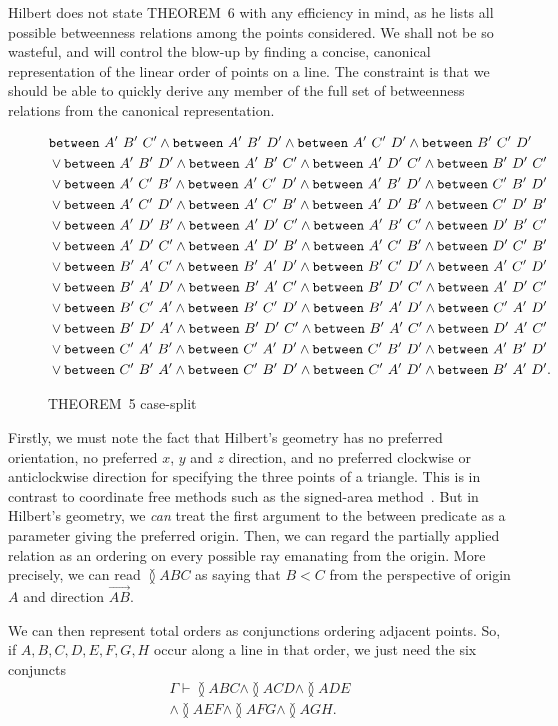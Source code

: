 Hilbert does not state THEOREM~6 with any efficiency in mind, as he lists all possible betweenness relations among the points considered. We shall not be so wasteful, and will control the blow-up by finding a concise, canonical representation of the linear order of points on a line. The constraint is that we should be able to quickly derive any member of the full set of betweenness relations from the canonical representation.

\begin{figure}
  \begin{align*}
    &\fourbetlong{A'}{B'}{C'}{D'}\\
    &\vee\fourbetlong{A'}{B'}{D'}{C'}\\
    &\vee\fourbetlong{A'}{C'}{B'}{D'}\\
    &\vee\fourbetlong{A'}{C'}{D'}{B'}\\
    &\vee\fourbetlong{A'}{D'}{B'}{C'}\\
    &\vee\fourbetlong{A'}{D'}{C'}{B'}\\
    &\vee\fourbetlong{B'}{A'}{C'}{D'}\\
    &\vee\fourbetlong{B'}{A'}{D'}{C'}\\
    &\vee\fourbetlong{B'}{C'}{A'}{D'}\\
    &\vee\fourbetlong{B'}{D'}{A'}{C'}\\
    &\vee\fourbetlong{C'}{A'}{B'}{D'}\\
    &\vee\fourbetlong{C'}{B'}{A'}{D'}.
  \end{align*}
\caption{THEOREM~5 case-split}
\label{fig:Theorem5CasesFormalised}
\end{figure}

Firstly, we must note the fact that Hilbert's geometry has no preferred orientation, no preferred $x$, $y$ and $z$ direction, and no preferred clockwise or anticlockwise direction for specifying the three points of a triangle. This is in contrast to coordinate free methods such as the signed-area method~\cite{SignedAreaMethod}. But in Hilbert's geometry, we \emph{can} treat the first argument to the between predicate as a parameter giving the preferred origin. Then, we can regard the partially applied relation as an ordering on every possible ray emanating from the origin. More precisely, we can read $\between{A}{B}{C}$ as saying that $B<C$ from the perspective of origin $A$ and direction $\overrightarrow{AB}$.

We can then represent total orders as conjunctions ordering adjacent points. So, if $A,B,C,D,E,F,G,H$ occur along a line in that order, we just need the six conjuncts
\begin{multline}\label{theorem:OrderRepExample}
\Gamma \vdash \between{A}{B}{C} \wedge \between{A}{C}{D} \wedge \between{A}{D}{E}\\
\wedge\between{A}{E}{F}\wedge\between{A}{F}{G}\wedge\between{A}{G}{H}.
\end{multline}

